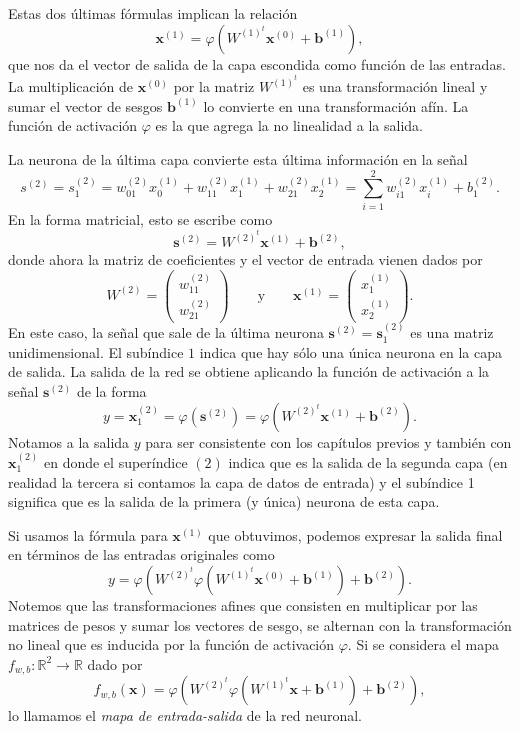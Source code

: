 \documentclass[12pt, a4paper]{amsbook}
\newcommand{\R}{{\mathbb R}}
\newcommand{\sbf}{{\mathbf s}}
\newcommand{\xx}{{\mathbf x}}
\newcommand{\bb}{{\mathbf b}}
\theoremstyle{remark}
\theoremstyle{definition}
\numberwithin{section}{chapter}
\numberwithin{subsection}{section}
\numberwithin{equation}{section}
\numberwithin{figure}{chapter}
\begin{document}
Estas dos últimas fórmulas implican la relación
$$
\xx^{(1)} = \varphi(W^{(1)^t} \xx^{(0)} + \bb^{(1)}),
$$
que nos da el vector de salida de la capa escondida como función de las entradas. La multiplicación de $\xx^{(0)}$ por la matriz $W^{(1)^t}$ es una transformación lineal y sumar el vector de sesgos $\bb^{(1)}$ lo convierte en una transformación afín. La función de activación $\varphi$ es la que agrega la no linealidad a la salida.

La neurona de la última capa convierte esta última información en la señal
$$
s^{(2)} = s_1^{(2)} = w_{01}^{(2)}  x_0^{(1)} + w_{11}^{(2)}  x_1^{(1)} + w_{21}^{(2)}  x_2^{(1)} = \sum_{i=1}^2 w_{i1}^{(2)}  x_i^{(1)} + b_1^{(2)}.
$$
En la forma matricial, esto se escribe como
$$
\sbf^{(2)} = W^{(2)^t} \xx^{(1)} + \bb^{(2)},
$$
donde ahora la matriz de coeficientes y el vector de entrada vienen dados por
$$
W^{(2)} = \begin{pmatrix}w_{11}^{(2)} \\ w_{21}^{(2)}\end{pmatrix}\qquad \text{y}\qquad \xx^{(1)} = \begin{pmatrix} x_1^{(1)}\\ x_2^{(1)}\end{pmatrix}.
$$
En este caso, la señal que sale de la última neurona $\sbf^{(2)} = \sbf_1^{(2)}$ es una matriz unidimensional. El subíndice $1$ indica que hay sólo una única neurona en la capa de salida. La salida de la red se obtiene aplicando la función de activación a la señal $\sbf^{(2)}$ de la forma
$$
y = \xx_1^{(2)} = \varphi(\sbf^{(2)}) = \varphi(W^{(2)^t} \xx^{(1)} + \bb^{(2)}).  
$$
Notamos a la salida $y$ para ser consistente con los capítulos previos y también con $\xx_1^{(2)}$ en donde el superíndice $(2)$ indica que es la salida de la segunda capa (en realidad la tercera si contamos la capa de datos de entrada) y el subíndice 1 significa que es la salida de la primera (y única) neurona de esta capa.

Si usamos la fórmula para $\xx^{(1)}$ que obtuvimos, podemos expresar la salida final en términos de las entradas originales como
\begin{equation}\label{formula.y}
y =  \varphi(W^{(2)^t}  \varphi(W^{(1)^t} \xx^{(0)} + \bb^{(1)})   + \bb^{(2)}).  
\end{equation}
Notemos que las transformaciones afines que consisten en multiplicar por las matrices de pesos y sumar los vectores de sesgo, se alternan con la transformación no lineal que es inducida por la función de activación $\varphi$. Si se considera el mapa $f_{w, b}\colon \R^2\to\R$ dado por
$$
f_{w, b}(\xx) =  \varphi(W^{(2)^t}  \varphi(W^{(1)^t} \xx + \bb^{(1)})   + \bb^{(2)}),
$$
lo llamamos el {\em mapa de entrada-salida} de la red neuronal.
\end{document}
